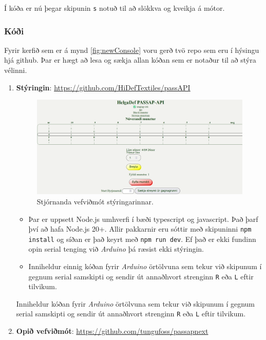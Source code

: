 Í kóða er nú þegar skipunin \texttt{s} notuð til að slökkva og kveikja á mótor.
\subsubsection{Kóði}
Fyrir kerfið sem er á mynd \ref{fig:newConsole} voru gerð tvö repo sem eru í hýsingu hjá github. Þar er hægt að lesa og sækja allan kóðan sem er notaður til að stýra vélinni.
\begin{enumerate}
    \item \textbf{Stýringin}: \url{https://github.com/HiDefTextiles/passAPI}
    
        \begin{figure}[t] %
    \centering
    \includegraphics[width=0.8\linewidth]{myndir/passapiscreen.png}
    \caption{Stjórnanda vefviðmót stýringarinnar.}
\end{figure}
    \begin{itemize}
        \item Þar er uppsett Node.js umhverfi í bæði typescript og javascript. Það þarf því að hafa Node.js 20+. Allir pakkarnir eru sóttir með skipuninni \texttt{npm install} og síðan er það keyrt með \texttt{npm run dev}. Ef það er ekki fundinn opin serial tenging við \textit{Arduino} þá ræsist ekki stýringin.
        \item     Inniheldur einnig kóðan fyrir \textit{Arduino} örtölvuna sem tekur við skipunum í gegnum serial samskipti og sendir út annaðhvort strenginn \texttt{R} eða \texttt{L} eftir tilvikum.
    \end{itemize}
    Inniheldur kóðan fyrir \textit{Arduino} örtölvuna sem tekur við skipunum í gegnum serial samskipti og sendir út annaðhvort strenginn \texttt{R} eða \texttt{L} eftir tilvikum.
    \item \textbf{Opið vefviðmót}: \url{https://github.com/tungufoss/passapnext} \\
    \begin{figure}[t] %

\end{figure}
\end{enumerate}
